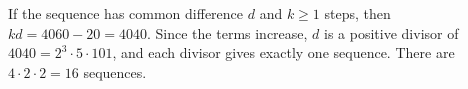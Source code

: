 If the sequence has common difference $d$ and $k\ge1$ steps, then $kd=4060-20=4040$. Since the terms increase, $d$ is a positive divisor of $4040=2^3\cdot5\cdot101$, and each divisor gives exactly one sequence. There are $4\cdot2\cdot2=\boxed{16}$ sequences.
